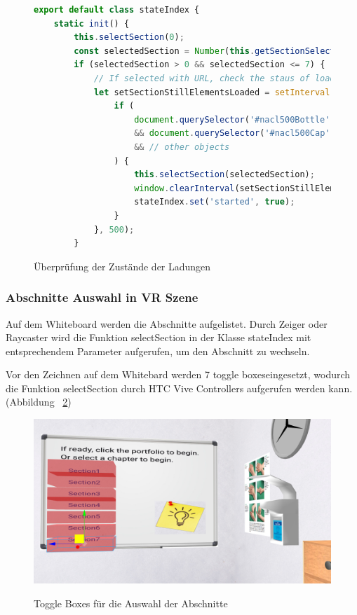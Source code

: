 \begin{figure}[ht]
\vspace*{1.2em}
\centering
\caption[Überprüfung der Zustände der Ladungen]{Überprüfung der Zustände der Ladungen}
\begin{lstlisting}[language=JavaScript, style=htmlcssjs]
export default class stateIndex {
    static init() {
        this.selectSection(0);
        const selectedSection = Number(this.getSectionSelectionFromURL());
        if (selectedSection > 0 && selectedSection <= 7) {
            // If selected with URL, check the staus of loading every 0.5 sec
            let setSectionStillElementsLoaded = setInterval(()=>{
                if (
                    document.querySelector('#nacl500Bottle')
                    && document.querySelector('#nacl500Cap')
                    && // other objects
                ) {
                    this.selectSection(selectedSection);
                    window.clearInterval(setSectionStillElementsLoaded);
                    stateIndex.set('started', true);
                }
            }, 500);
        }
\end{lstlisting}

\label{fig:checkLadung} 
\end{figure}
  
  \subsubsection{Abschnitte Auswahl in VR Szene}
  Auf dem Whiteboard werden die Abschnitte aufgelistet. Durch Zeiger oder Raycaster wird die Funktion {\selectfont selectSection} in der Klasse {\selectfont stateIndex} mit entsprechendem Parameter aufgerufen, um den Abschnitt zu wechseln.
  
  Vor den Zeichnen auf dem Whitebard werden 7 \glqq toggle boxes\grqq eingesetzt, wodurch die Funktion {\selectfont selectSection} durch HTC Vive Controllers aufgerufen werden kann. (Abbildung ~\ref{fig:toggleBoxAbschnitte})
  
\begin{figure}[ht]
\vspace*{1em}
\centering
\caption[Toggle Boxes]{Toggle Boxes für die Auswahl der Abschnitte}
\includegraphics[width=\textwidth]{images/toggleBoxAbschnitte.png}
\label{fig:toggleBoxAbschnitte} 
\end{figure}
  

